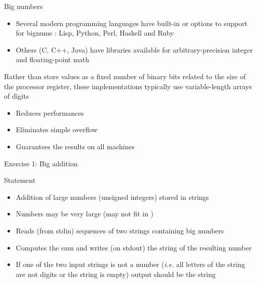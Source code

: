 \documentclass{beamer}
\begin{document}
\begin{frame}{Big numbers}
  \begin{block}{}
    \begin{itemize}
      \item Several modern programming languages have built-in or options to support for bignums : Lisp, Python, Perl, Haskell and Ruby 
      \item Others (C, C++, Java) have libraries available for arbitrary-precision integer and floating-point math
    \end{itemize}
  \end{block}
  \begin{block}{}
    Rather than store values as a fixed number of binary bits related to the size of the processor register, these implementations typically use variable-length arrays of digits 
    \begin{itemize}
      \item Reduces performances
      \item Eliminates simple overflow
      \item Guarantees the results on all machines
    \end{itemize}
  \end{block}
\end{frame}

\begin{frame}[fragile]{Exercise 1: Big addition}
  \begin{block}{Statement}
    \begin{itemize}
      \item Addition of large numbers (unsigned integers) stored in strings
      \item Numbers may be very large (may not fit in )
      \item Reads (from stdin) sequences of two strings containing big numbers
      \item Computes the sum and writes (on stdout) the string of the resulting number
      \item If one of the two input strings is not a number (\textit{i.e.} all letters of the string are not digits or the string is empty) output should be the string 
    \end{itemize}
  \end{block}
\end{frame}
\end{document}
